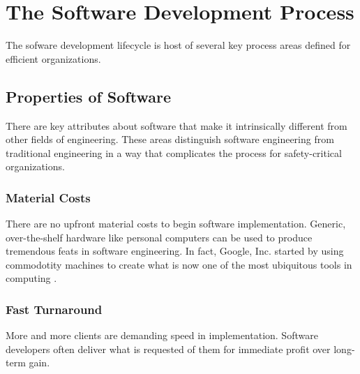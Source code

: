 \section{The Software Development Process}

The sofware development lifecycle is host of several key process areas defined
for efficient organizations.

\subsection{Properties of Software}

There are key attributes about software that make it intrinsically different
from other fields of engineering. These areas distinguish software engineering
from traditional engineering in a way that complicates the process for
safety-critical organizations.

\subsubsection*{Material Costs}

There are no upfront material costs to begin software implementation. Generic,
over-the-shelf hardware like personal computers can be used to produce
tremendous feats in software engineering. In fact, Google, Inc. started by using
commodotity machines to create what is now one of the most ubiquitous tools in
computing \cite{Google}.

\subsubsection*{Fast Turnaround}

More and more clients are demanding speed in implementation. Software developers
often deliver what is requested of them for immediate profit over long-term gain.
